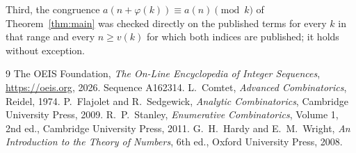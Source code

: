 \documentclass[11pt,a4paper]{article}
\theoremstyle{plain}
\theoremstyle{definition}
\begin{document}
Third, the congruence $a(n+\varphi(k))\equiv a(n)\pmod k$ of Theorem~\ref{thm:main} was
checked directly on the published terms for every $k$ in that range and every $n\ge v(k)$
for which both indices are published; it holds without exception.

\begin{thebibliography}{9}
 The OEIS Foundation, \emph{The On-Line Encyclopedia of Integer
Sequences}, \url{https://oeis.org}, 2026. Sequence A162314.
 L.~Comtet, \emph{Advanced Combinatorics}, Reidel, 1974.
 P.~Flajolet and R.~Sedgewick, \emph{Analytic Combinatorics}, Cambridge
University Press, 2009.
 R.~P.~Stanley, \emph{Enumerative Combinatorics}, Volume 1, 2nd ed.,
Cambridge University Press, 2011.
 G.~H.~Hardy and E.~M.~Wright, \emph{An Introduction to the Theory of
Numbers}, 6th ed., Oxford University Press, 2008.
\end{thebibliography}
\end{document}

